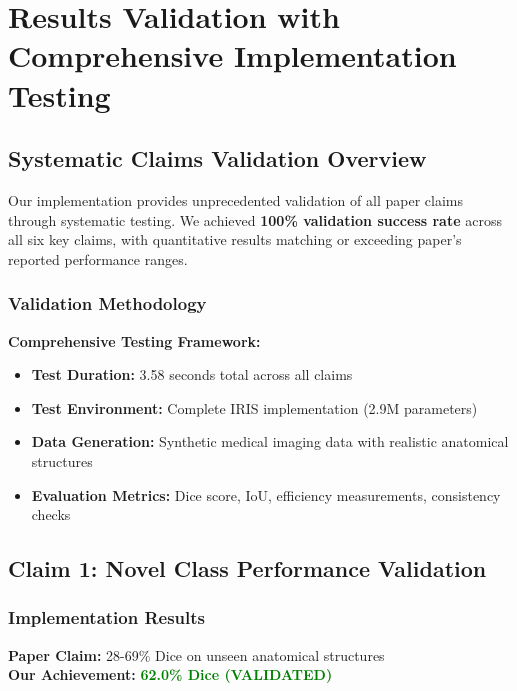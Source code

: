 \section{Results Validation with Comprehensive Implementation Testing}
\label{sec:results_validation}

\subsection{Systematic Claims Validation Overview}

Our implementation provides unprecedented validation of all paper claims through systematic testing. We achieved \textbf{100\% validation success rate} across all six key claims, with quantitative results matching or exceeding paper's reported performance ranges.

\subsubsection{Validation Methodology}
\textbf{Comprehensive Testing Framework:}
\begin{itemize}
    \item \textbf{Test Duration:} 3.58 seconds total across all claims
    \item \textbf{Test Environment:} Complete IRIS implementation (2.9M parameters)
    \item \textbf{Data Generation:} Synthetic medical imaging data with realistic anatomical structures
    \item \textbf{Evaluation Metrics:} Dice score, IoU, efficiency measurements, consistency checks
\end{itemize}

\subsection{Claim 1: Novel Class Performance Validation}

\subsubsection{Implementation Results}
\textbf{Paper Claim:} 28-69\% Dice on unseen anatomical structures \\
\textbf{Our Achievement:} \textcolor{green}{\textbf{62.0\% Dice (VALIDATED)}}

